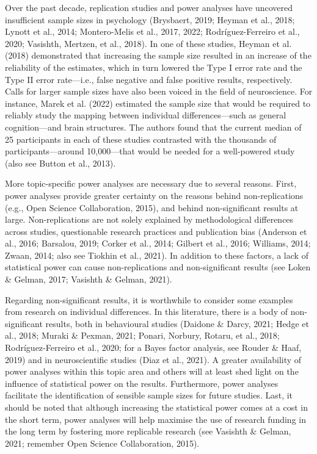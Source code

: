 \documentclass[
  12pt,
  man,floatsintext]{apa7}
\begin{document}
Over the past decade, replication studies and power analyses have uncovered insufficient sample sizes in psychology (Brysbaert, 2019; Heyman et al., 2018; Lynott et al., 2014; Montero-Melis et al., 2017, 2022; Rodríguez-Ferreiro et al., 2020; Vasishth, Mertzen, et al., 2018). In one of these studies, Heyman et al. (2018) demonstrated that increasing the sample size resulted in an increase of the reliability of the estimates, which in turn lowered the Type I error rate and the Type II error rate---i.e., false negative and false positive results, respectively. Calls for larger sample sizes have also been voiced in the field of neuroscience. For instance, Marek et al. (2022) estimated the sample size that would be required to reliably study the mapping between individual differences---such as general cognition---and brain structures. The authors found that the current median of 25 participants in each of these studies contrasted with the thousands of participants---around 10,000---that would be needed for a well-powered study (also see Button et al., 2013).

More topic-specific power analyses are necessary due to several reasons. First, power analyses provide greater certainty on the reasons behind non-replications (e.g., Open Science Collaboration, 2015), and behind non-significant results at large. Non-replications are not solely explained by methodological differences across studies, questionable research practices and publication bias (Anderson et al., 2016; Barsalou, 2019; Corker et al., 2014; Gilbert et al., 2016; Williams, 2014; Zwaan, 2014; also see Tiokhin et al., 2021). In addition to these factors, a lack of statistical power can cause non-replications and non-significant results (see Loken \& Gelman, 2017; Vasishth \& Gelman, 2021).

Regarding non-significant results, it is worthwhile to consider some examples from research on individual differences. In this literature, there is a body of non-significant results, both in behavioural studies (Daidone \& Darcy, 2021; Hedge et al., 2018; Muraki \& Pexman, 2021; Ponari, Norbury, Rotaru, et al., 2018; Rodríguez-Ferreiro et al., 2020; for a Bayes factor analysis, see Rouder \& Haaf, 2019) and in neuroscientific studies (Diaz et al., 2021). A greater availability of power analyses within this topic area and others will at least shed light on the influence of statistical power on the results. Furthermore, power analyses facilitate the identification of sensible sample sizes for future studies. Last, it should be noted that although increasing the statistical power comes at a cost in the short term, power analyses will help maximise the use of research funding in the long term by fostering more replicable research (see Vasishth \& Gelman, 2021; remember Open Science Collaboration, 2015).
\end{document}
